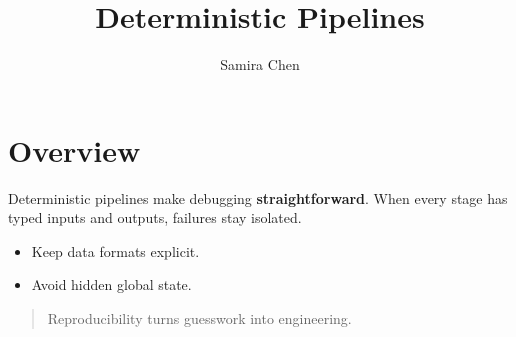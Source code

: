 \documentclass{article}
\title{Deterministic Pipelines}
\author{Samira Chen}
\begin{document}
\maketitle
\section{Overview}
Deterministic pipelines make debugging \textbf{straightforward}. When every stage has typed inputs and outputs, failures stay isolated.
\begin{itemize}
\item Keep data formats explicit.
\item Avoid hidden global state.
\end{itemize}
\begin{quote}
Reproducibility turns guesswork into engineering.
\end{quote}
\end{document}
